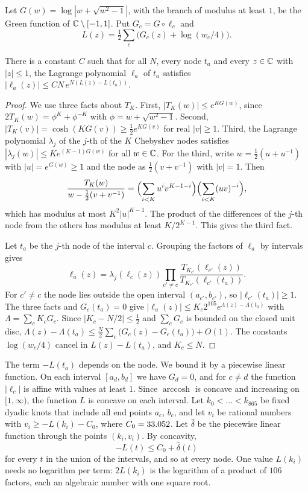 Let $G(w)=\log|w+\sqrt{w^2-1}|$, with the branch of modulus at least $1$, be the Green function of
$\mathbb C\setminus[-1,1]$. Put $G_c=G\circ\ell_c$ and
\begin{equation}\label{eq:Ldef}
 L(z)=\tfrac12\sum_c\bigl(G_c(z)+\log(w_c/4)\bigr).
\end{equation}

\begin{lemma}\label{lem:lagrange}
There is a constant $C$ such that for all $N$, every node $t_a$ and every $z\in\mathbb C$ with $|z|\le1$, the
Lagrange polynomial $\ell_a$ of $t_a$ satisfies $|\ell_a(z)|\le CN\,e^{N(L(z)-L(t_a))}$.
\end{lemma}

\begin{proof}
We use three facts about $T_K$. First, $|T_K(w)|\le e^{KG(w)}$, since $2T_K(w)=\phi^K+\phi^{-K}$ with
$\phi=w+\sqrt{w^2-1}$. Second, $|T_K(v)|=\cosh(KG(v))\ge\frac12e^{KG(v)}$ for real $|v|\ge1$. Third, the
Lagrange polynomial $\lambda_j$ of the $j$-th of the $K$ Chebyshev nodes satisfies
$|\lambda_j(w)|\le Ke^{(K-1)G(w)}$ for all $w\in\mathbb C$. For the third, write $w=\frac12(u+u^{-1})$ with
$|u|=e^{G(w)}\ge1$ and the node as $\frac12(v+v^{-1})$ with $|v|=1$. Then
\[
 \frac{T_K(w)}{w-\frac12(v+v^{-1})}=\Bigl(\sum_{i<K}u^iv^{K-1-i}\Bigr)\Bigl(\sum_{i<K}(uv)^{-i}\Bigr),
\]
which has modulus at most $K^2|u|^{K-1}$. The product of the differences of the $j$-th node from the others
has modulus at least $K/2^{K-1}$. This gives the third fact.

Let $t_a$ be the $j$-th node of the interval $c$. Grouping the factors of $\ell_a$ by intervals gives
\[
 \ell_a(z)=\lambda_j(\ell_c(z))\prod_{c'\ne c}\frac{T_{K_{c'}}(\ell_{c'}(z))}{T_{K_{c'}}(\ell_{c'}(t_a))}.
\]
For $c'\ne c$ the node lies outside the open interval $(a_{c'},b_{c'})$, so $|\ell_{c'}(t_a)|\ge1$. The
three facts and $G_c(t_a)=0$ give $|\ell_a(z)|\le K_c2^{105}e^{\Lambda(z)-\Lambda(t_a)}$ with
$\Lambda=\sum_cK_cG_c$. Since $|K_c-N/2|\le\frac12$ and $\sum_cG_c$ is bounded on the closed unit disc,
$\Lambda(z)-\Lambda(t_a)\le\frac N2\sum_c\bigl(G_c(z)-G_c(t_a)\bigr)+O(1)$. The constants $\log(w_c/4)$ cancel
in $L(z)-L(t_a)$, and $K_c\le N$.
\end{proof}

The term $-L(t_a)$ depends on the node. We bound it by a piecewise linear function. On each interval
$[a_d,b_d]$ we have $G_d=0$, and for $c\ne d$ the function $|\ell_c|$ is affine with values at least $1$.
Since $\operatorname{arccosh}$ is concave and increasing on $[1,\infty)$, the function $L$ is concave on each
interval. Let $k_0<\dots<k_{865}$ be fixed dyadic knots that include all end points $a_c$, $b_c$, and let
$v_i$ be rational numbers with $v_i\ge-L(k_i)-C_0$, where $C_0=33.052$. Let $\hat\delta$ be the piecewise
linear function through the points $(k_i,v_i)$. By concavity,
\begin{equation}\label{eq:chord}
 -L(t)\le C_0+\hat\delta(t)
\end{equation}
for every $t$ in the union of the intervals, and so at every node. One value $L(k_i)$ needs no
logarithm per term: $2L(k_i)$ is the logarithm of a product of $106$ factors, each an algebraic number with
one square root.

